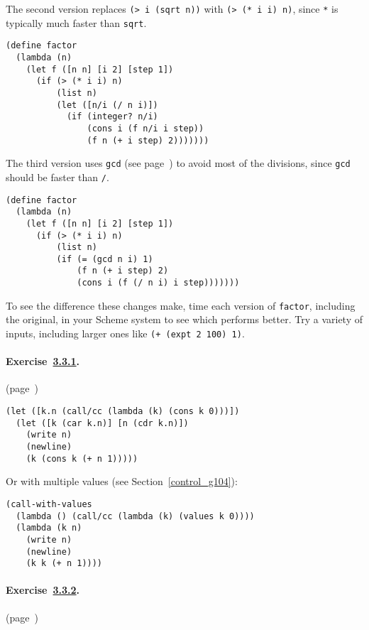The second version replaces \texttt{(\textgreater{} i (sqrt n))} with \texttt{(\textgreater{} (* i i) n)}, since \texttt{*} is typically much faster than \texttt{sqrt}. 
\begin{alltt}
(define factor
   (lambda (n)
     (let f ([n n] [i 2] [step 1])
       (if (\textgreater{} (* i i) n)
           (list n)
           (let ([n/i (/ n i)])
             (if (integer? n/i)
                 (cons i (f n/i i step))
                 (f n (+ i step) 2)))))))
\end{alltt}

The third version uses \texttt{gcd} (see page \pageref{objects_page_gcd}) to avoid most of the divisions, since \texttt{gcd} should be faster than \texttt{/}. 
\begin{alltt}
(define factor
   (lambda (n)
     (let f ([n n] [i 2] [step 1])
       (if (\textgreater{} (* i i) n)
           (list n)
           (if (= (gcd n i) 1)
               (f n (+ i step) 2)
               (cons i (f (/ n i) i step)))))))
\end{alltt}

To see the difference these changes make, time each version of \texttt{factor}, including the original, in your Scheme system to see which performs better. Try a variety of inputs, including larger ones like \texttt{(+ (expt 2 100) 1)}. 


\paragraph{Exercise \hyperref[further_g70]{3.3.1}. }(page \pageref{further_s66})

  
\begin{alltt}
 (let ([k.n (call/cc (lambda (k) (cons k 0)))])
   (let ([k (car k.n)] [n (cdr k.n)])
     (write n)
     (newline)
     (k (cons k (+ n 1)))))
\end{alltt}

Or with multiple values (see Section \ref{control_g104}): 
\begin{alltt}
(call-with-values
   (lambda () (call/cc (lambda (k) (values k 0))))
   (lambda (k n)
     (write n)
     (newline)
     (k k (+ n 1))))
\end{alltt}



\paragraph{Exercise \hyperref[further_g71]{3.3.2}. }(page \pageref{further_s67})

